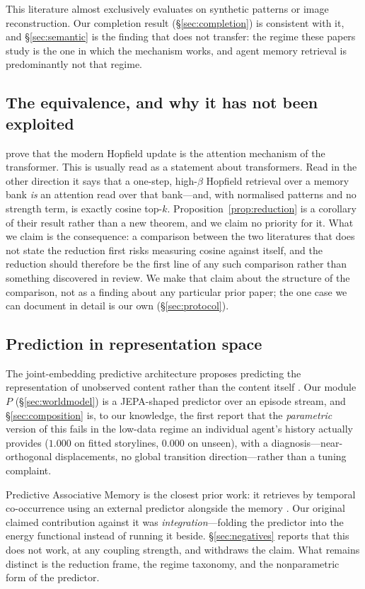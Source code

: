 This literature almost exclusively evaluates on synthetic patterns or image reconstruction.
Our completion result (\S\ref{sec:completion}) is consistent with it, and
\S\ref{sec:semantic} is the finding that does not transfer: the regime these papers study is
the one in which the mechanism works, and agent memory retrieval is predominantly not that
regime.

\subsection{The equivalence, and why it has not been exploited}

\citet{ramsauer2021hopfield} prove that the modern Hopfield update is the attention
mechanism of the transformer. This is usually read as a statement about transformers. Read in
the other direction it says that a one-step, high-$\beta$ Hopfield retrieval over a memory
bank \emph{is} an attention read over that bank---and, with normalised patterns and no
strength term, is exactly cosine top-$k$. Proposition~\ref{prop:reduction} is a corollary of
their result rather than a new theorem, and we claim no priority for it. What we claim is the
consequence: a comparison between the two literatures that does not state the reduction
first risks measuring cosine against itself, and the reduction should therefore be the first
line of any such comparison rather than something discovered in review. We make that claim
about the structure of the comparison, not as a finding about any particular prior paper; the
one case we can document in detail is our own (\S\ref{sec:protocol}).

\subsection{Prediction in representation space}

The joint-embedding predictive architecture proposes predicting the representation of
unobserved content rather than the content itself \citep{lecun2022path,assran2023ijepa}. Our
module $P$ (\S\ref{sec:worldmodel}) is a JEPA-shaped predictor over an episode stream, and
\S\ref{sec:composition} is, to our knowledge, the first report that the \emph{parametric}
version of this fails in the low-data regime an individual agent's history actually provides
($1.000$ on fitted storylines, $0.000$ on unseen), with a diagnosis---near-orthogonal
displacements, no global transition direction---rather than a tuning complaint.

Predictive Associative Memory is the closest prior work: it retrieves by temporal
co-occurrence using an external predictor alongside the memory \citep{dury2026pam}. Our
original claimed contribution against it was \emph{integration}---folding the predictor into
the energy functional instead of running it beside. \S\ref{sec:negatives} reports that this
does not work, at any coupling strength, and withdraws the claim. What remains distinct is
the reduction frame, the regime taxonomy, and the nonparametric form of the predictor.

